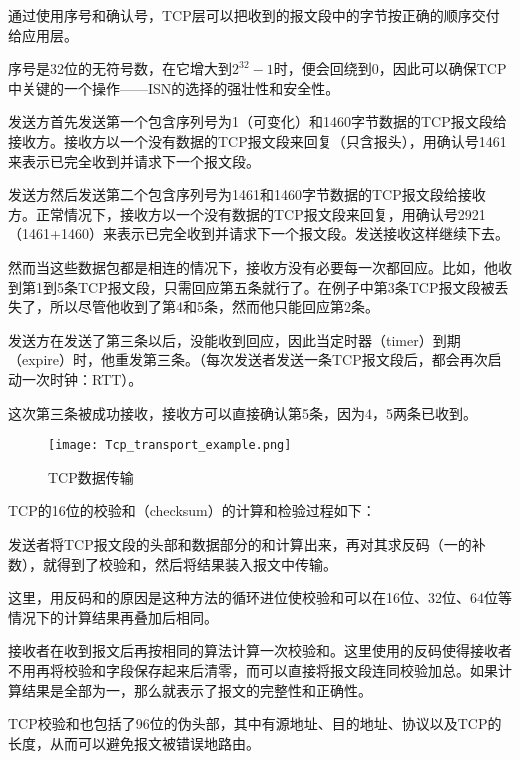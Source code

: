 通过使用序号和确认号，TCP层可以把收到的报文段中的字节按正确的顺序交付给应用层。

序号是32位的无符号数，在它增大到$2^{32}-1$时，便会回绕到0，因此可以确保TCP中关键的一个操作——ISN的选择的强壮性和安全性。

\begin{compactenum}
\item 发送方首先发送第一个包含序列号为1（可变化）和1460字节数据的TCP报文段给接收方。接收方以一个没有数据的TCP报文段来回复（只含报头），用确认号1461来表示已完全收到并请求下一个报文段。

\item 发送方然后发送第二个包含序列号为1461和1460字节数据的TCP报文段给接收方。正常情况下，接收方以一个没有数据的TCP报文段来回复，用确认号2921（1461+1460）来表示已完全收到并请求下一个报文段。发送接收这样继续下去。

\item 然而当这些数据包都是相连的情况下，接收方没有必要每一次都回应。比如，他收到第1到5条TCP报文段，只需回应第五条就行了。在例子中第3条TCP报文段被丢失了，所以尽管他收到了第4和5条，然而他只能回应第2条。

\item 发送方在发送了第三条以后，没能收到回应，因此当定时器（timer）到期（expire）时，他重发第三条。（每次发送者发送一条TCP报文段后，都会再次启动一次时钟：RTT）。

\item 这次第三条被成功接收，接收方可以直接确认第5条，因为4，5两条已收到。

\end{compactenum}

\begin{figure}[htbp]
\centering
\texttt{[image: Tcp\_transport\_example.png]}
\caption{TCP数据传输}
\end{figure}

TCP的16位的校验和（checksum）的计算和检验过程如下：

发送者将TCP报文段的头部和数据部分的和计算出来，再对其求反码（一的补数），就得到了校验和，然后将结果装入报文中传输。

这里，用反码和的原因是这种方法的循环进位使校验和可以在16位、32位、64位等情况下的计算结果再叠加后相同。

接收者在收到报文后再按相同的算法计算一次校验和。这里使用的反码使得接收者不用再将校验和字段保存起来后清零，而可以直接将报文段连同校验加总。如果计算结果是全部为一，那么就表示了报文的完整性和正确性。

TCP校验和也包括了96位的伪头部，其中有源地址、目的地址、协议以及TCP的长度，从而可以避免报文被错误地路由。

